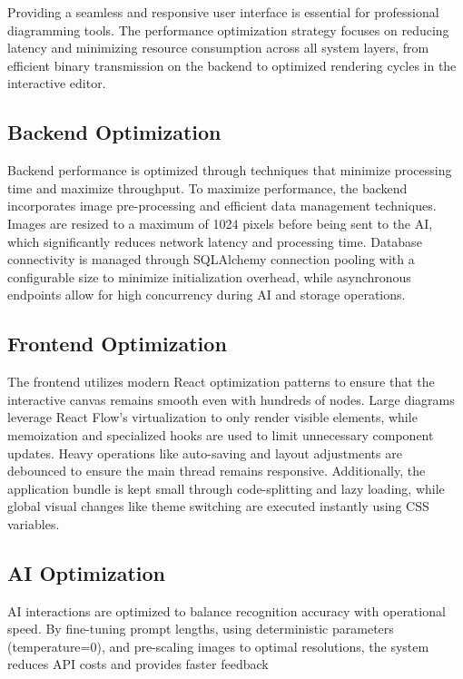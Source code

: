 \justifying
Providing a seamless and responsive user interface is essential for professional diagramming tools. The performance optimization strategy focuses on reducing latency and minimizing resource consumption across all system layers, from efficient binary transmission on the backend to optimized rendering cycles in the interactive editor.

\subsection{Backend Optimization}

\justifying
Backend performance is optimized through techniques that minimize processing time and maximize throughput. To maximize performance, the backend incorporates image pre-processing and efficient data management techniques. Images are resized to a maximum of 1024 pixels before being sent to the AI, which significantly reduces network latency and processing time. Database connectivity is managed through SQLAlchemy connection pooling with a configurable size to minimize initialization overhead, while asynchronous endpoints allow for high concurrency during AI and storage operations.

\subsection{Frontend Optimization}

\justifying
The frontend utilizes modern React optimization patterns to ensure that the interactive canvas remains smooth even with hundreds of nodes. Large diagrams leverage React Flow’s virtualization to only render visible elements, while memoization and specialized hooks are used to limit unnecessary component updates. Heavy operations like auto-saving and layout adjustments are debounced to ensure the main thread remains responsive. Additionally, the application bundle is kept small through code-splitting and lazy loading, while global visual changes like theme switching are executed instantly using CSS variables.

\subsection{AI Optimization}

\justifying
AI interactions are optimized to balance recognition accuracy with operational speed. By fine-tuning prompt lengths, using deterministic parameters (temperature=0), and pre-scaling images to optimal resolutions, the system reduces API costs and provides faster feedback 

